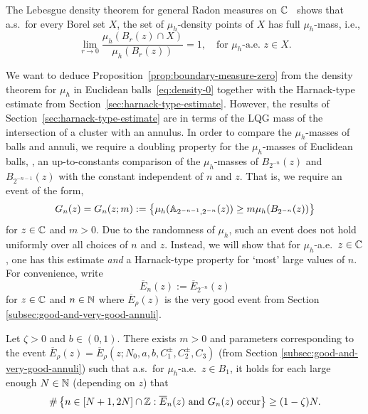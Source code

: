 \documentclass[12pt]{amsart}
\numberwithin{equation}{section}
\begin{document}
	
	The Lebesgue density theorem for general Radon measures on $\mathbb{C}$~\cite[Corollary 2.14]{mattila1999geometry} shows that a.s.\ for every Borel set $X$, the set of $\mu_h$-density points of $X$ has full $\mu_h$-mass, i.e., 
	\begin{equation} \label{eq:density-0}
	\lim_{r \to 0} \frac{\mu_h(B_r(z) \cap X)}{\mu_h(B_r(z))} = 1,\quad \text{for $\mu_h$-a.e.\ $z\in X$}. 
	\end{equation}
	
	
	We want to deduce Proposition~\ref{prop:boundary-measure-zero} from the density theorem for $\mu_h$ in Euclidean balls~\eqref{eq:density-0}
	together with the Harnack-type estimate from Section~\ref{sec:harnack-type-estimate}. 
	However, the results of Section~\ref{sec:harnack-type-estimate} are in terms of the LQG mass of the intersection of a cluster with an annulus. In order to compare the $\mu_h$-masses of balls and annuli, we require a doubling property for the $\mu_h$-masses of Euclidean balls, \ie, an up-to-constants comparison of the $\mu_h$-masses of $B_{2^{-n}}(z)$ and $B_{2^{-n-1}}(z)$ with the constant independent of $n$ and $z$. That is, we require an event of the form,
	\begin{equation} \label{eq:annulus-ball-comparison}
	G_{n}(z) = G_n(z; m) := \left\{\mu_{h}(\mathbb{A}_{2^{-n-1}, 2^{-n}}(z)) \geq m \mu_{h}(B_{2^{-n}}(z)) \right\}
	\end{equation}
	for $z \in \mathbb{C}$ and $m > 0$. 
	Due to the randomness of $\mu_h$, such an event does not hold uniformly over all choices of $n$ and $z$. Instead, we will show that for $\mu_h$-a.e.\ $z \in \mathbb{C}$, one has this estimate 
	{\it and} a Harnack-type property for `most' large values of $n$. For convenience, write
	\begin{equation} \label{eq:very-good-annuli-event}
	\overline E_{n}(z) := \overline E_{2^{-n}}(z)
	\end{equation}
	for $z \in \mathbb{C}$ and $n \in \mathbb{N}$ where $\overline E_{\rho}(z)$ is the very good event from Section \ref{subsec:good-and-very-good-annuli}.
	
	\begin{lemma} \label{lemma:mu_h-doubling-and-harnack}
		Let $\zeta > 0$ and $b \in (0,1)$. There exists $m > 0$ and parameters corresponding to the event $\overline E_{\rho}(z) = \overline E_{\rho}(z; N_0, a, b, C_1^{\pm}, C_2^{\pm}, C_3)$ (from Section \ref{subsec:good-and-very-good-annuli}) such that a.s.\ for $\mu_h$-a.e.\ $z\in  B_1$, it holds for each large enough $N\in \mathbb{N}$ (depending on $z$) that
		\begin{equation} \label{eq:mu_h-doubling}
		\#\left\{ n \in [N+1,2N] \cap \mathbb{Z} : \mbox{$\overline E_{n}(z)$ and $G_{n}(z)$ occur} \right\}  \geq (1-\zeta) N.
		\end{equation}  
	\end{lemma}
	
\end{document}

